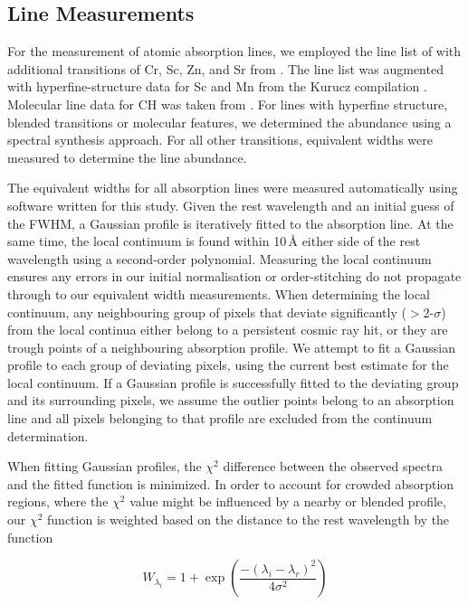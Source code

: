 \documentclass{emulateapj}
\begin{document}
\subsection{Line Measurements}
\label{sec:line-measurements}

For the measurement of atomic absorption lines, we employed the line list of \citet{yong;et-al_2005} with additional transitions of Cr, Sc, Zn, and Sr from \citet{frebel;et-al_2010}. The line list was augmented with hyperfine-structure data for Sc and Mn from the Kurucz compilation \citet{kurucz;1998}. Molecular line data for CH was taken from \citet{plez;et-al_2008,plez;et-al_2009}. For lines with hyperfine structure, blended transitions or molecular features, we determined the abundance using a spectral synthesis approach. For all other transitions, equivalent widths were measured to determine the line abundance.

The equivalent widths for all absorption lines were measured automatically using software written for this study. Given the rest wavelength and an initial guess of the FWHM, a Gaussian profile is iteratively fitted to the absorption line. At the same time, the local continuum is found within 10\,\AA{} either side of the rest wavelength using a second-order polynomial. Measuring the local continuum ensures any errors in our initial normalisation or order-stitching do not propagate through to our equivalent width measurements. When determining the local continuum, any neighbouring group of pixels that deviate significantly ($>$2-$\sigma$) from the local continua either belong to a persistent cosmic ray hit, or they are trough points of a neighbouring absorption profile. We attempt to fit a Gaussian profile to each group of deviating pixels, using the current best estimate for the local continuum. If a Gaussian profile is successfully fitted to the deviating group and its surrounding pixels, we assume the outlier points belong to an absorption line and all pixels belonging to that profile are excluded from the continuum determination. 

When fitting Gaussian profiles, the $\chi^2$ difference between the observed spectra and the fitted function is minimized. In order to account for crowded absorption regions, where the $\chi^2$ value might be influenced by a nearby or blended profile, our $\chi^2$ function is weighted based on the distance to the rest wavelength by the function

\begin{equation}
W_{\lambda_{i}} = 1 + \exp{\left(\frac{-(\lambda_{i} - \lambda_{r})^2}{4\sigma^2}\right)}
\label{eq:chi-weight}
\end{equation}
\end{document}

